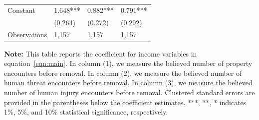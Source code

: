 \documentclass[english,12pt]{article}
\begin{document}
\begin{table}[H]
\begin{tabular}{@{}llll@{}}
        Constant    &       1.648***&       0.882***&       0.791***\\
                    &     (0.264)   &     (0.272)   &     (0.292)   \\
        Observations & 1,157    &  1,157       & 1,157        \\\bottomrule
    \end{tabular}
    \begin{minipage}{.9\textwidth}
            \vspace{1em}
    \footnotesize{{\bf{Note:}} This table reports the coefficient for income variables in equation~\ref{eqn:main}. In column (1), we measure the believed number of property encounters before removal. In column (2), we measure the believed number of human threat encounters before removal. In column (3), we measure the believed number of human injury encounters before removal. Clustered standard errors are provided in the parentheses below the coefficient estimates. ***, **, * indicates 1\%, 5\%, and 10\% statistical significance, respectively.}
    \label{tab: bel_inc}
    \end{minipage}
\end{table}
\end{document}
